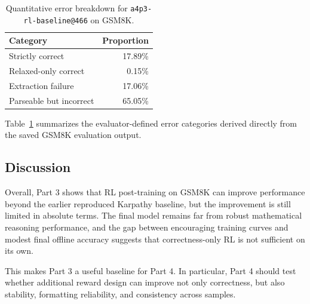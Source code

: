 \begin{table}[h]
\centering
\caption{Quantitative error breakdown for \texttt{a4p3-rl-baseline@466} on GSM8K.}
\label{tab:p3_error_breakdown}
\begin{tabular}{l r}
\hline
\textbf{Category} & \textbf{Proportion} \\
\hline
Strictly correct & 17.89\% \\
Relaxed-only correct & 0.15\% \\
Extraction failure & 17.06\% \\
Parseable but incorrect & 65.05\% \\
\hline
\end{tabular}
\end{table}

Table~\ref{tab:p3_error_breakdown} summarizes the evaluator-defined error categories derived directly from the saved GSM8K evaluation output.

\subsection{Discussion}

Overall, Part 3 shows that RL post-training on GSM8K can improve performance beyond the earlier reproduced Karpathy baseline, but the improvement is still limited in absolute terms. The final model remains far from robust mathematical reasoning performance, and the gap between encouraging training curves and modest final offline accuracy suggests that correctness-only RL is not sufficient on its own.

This makes Part 3 a useful baseline for Part 4. In particular, Part 4 should test whether additional reward design can improve not only correctness, but also stability, formatting reliability, and consistency across samples.